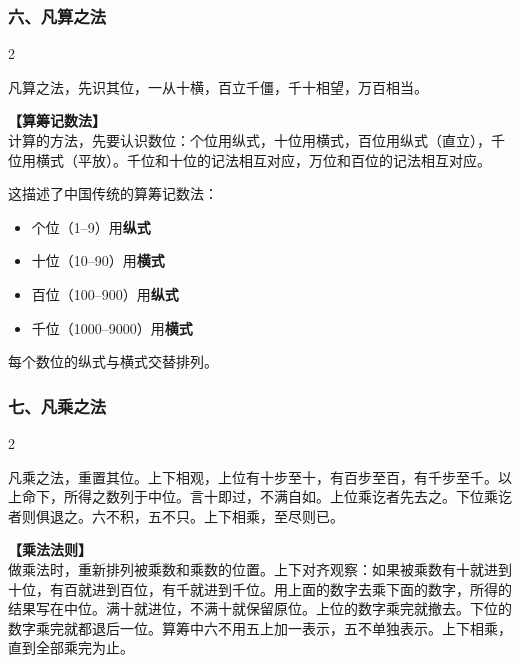 \documentclass[11pt,a4paper]{article}
\begin{document}
\subsubsection*{六、凡算之法}
\begin{paracol}{2}
\begin{problemclassical}
凡算之法，先识其位，一从十横，百立千僵，千十相望，万百相当。
\end{problemclassical}
\switchcolumn
\begin{problemmodern}
\textbf{【算筹记数法】}\\
计算的方法，先要认识数位：个位用纵式，十位用横式，百位用纵式（直立），千位用横式（平放）。千位和十位的记法相互对应，万位和百位的记法相互对应。

这描述了中国传统的算筹记数法：
\begin{itemize}[leftmargin=1.5em,topsep=1pt,itemsep=0pt]
  \item 个位（1--9）用\textbf{纵式}
  \item 十位（10--90）用\textbf{横式}
  \item 百位（100--900）用\textbf{纵式}
  \item 千位（1000--9000）用\textbf{横式}
\end{itemize}
每个数位的纵式与横式交替排列。
\end{problemmodern}
\end{paracol}

\vspace{0.3cm}

\subsubsection*{七、凡乘之法}
\begin{paracol}{2}
\begin{problemclassical}
凡乘之法，重置其位。上下相观，上位有十步至十，有百步至百，有千步至千。以上命下，所得之数列于中位。言十即过，不满自如。上位乘讫者先去之。下位乘讫者则俱退之。六不积，五不只。上下相乘，至尽则已。
\end{problemclassical}
\switchcolumn
\begin{problemmodern}
\textbf{【乘法法则】}\\
做乘法时，重新排列被乘数和乘数的位置。上下对齐观察：如果被乘数有十就进到十位，有百就进到百位，有千就进到千位。用上面的数字去乘下面的数字，所得的结果写在中位。满十就进位，不满十就保留原位。上位的数字乘完就撤去。下位的数字乘完就都退后一位。算筹中六不用五上加一表示，五不单独表示。上下相乘，直到全部乘完为止。
\end{problemmodern}
\end{paracol}
\end{document}
